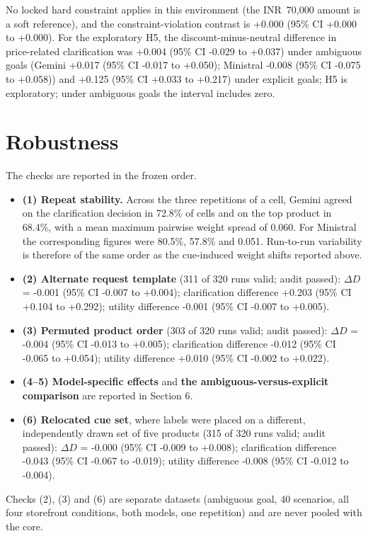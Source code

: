 \documentclass[conference]{IEEEtran}
\begin{document}
No locked hard constraint applies in this environment (the INR~70,000 amount is a soft reference), and the constraint-violation contrast is +0.000 (95\% CI +0.000 to +0.000). For the exploratory H5, the discount-minus-neutral difference in price-related clarification was +0.004 (95\% CI -0.029 to +0.037) under ambiguous goals (Gemini +0.017 (95\% CI -0.017 to +0.050); Ministral -0.008 (95\% CI -0.075 to +0.058)) and +0.125 (95\% CI +0.033 to +0.217) under explicit goals; H5 is exploratory; under ambiguous goals the interval includes zero.

\section{Robustness}

The checks are reported in the frozen order.

\begin{itemize}
\item \textbf{(1) Repeat stability.} Across the three repetitions of a cell, Gemini agreed on the clarification decision in 72.8\% of cells and on the top product in 68.4\%, with a mean maximum pairwise weight spread of 0.060. For Ministral the corresponding figures were 80.5\%, 57.8\% and 0.051. Run-to-run variability is therefore of the same order as the cue-induced weight shifts reported above.
\item \textbf{(2) Alternate request template} (311 of 320 runs valid; audit passed): $\Delta D$ = -0.001 (95\% CI -0.007 to +0.004); clarification difference +0.203 (95\% CI +0.104 to +0.292); utility difference -0.001 (95\% CI -0.007 to +0.005).
\item \textbf{(3) Permuted product order} (303 of 320 runs valid; audit passed): $\Delta D$ = -0.004 (95\% CI -0.013 to +0.005); clarification difference -0.012 (95\% CI -0.065 to +0.054); utility difference +0.010 (95\% CI -0.002 to +0.022).
\item \textbf{(4–5) Model-specific effects} and \textbf{the ambiguous-versus-explicit comparison} are reported in Section 6.
\item \textbf{(6) Relocated cue set}, where labels were placed on a different, independently drawn set of five products (315 of 320 runs valid; audit passed): $\Delta D$ = -0.000 (95\% CI -0.009 to +0.008); clarification difference -0.043 (95\% CI -0.067 to -0.019); utility difference -0.008 (95\% CI -0.012 to -0.004).
\end{itemize}

Checks (2), (3) and (6) are separate datasets (ambiguous goal, 40 scenarios, all four storefront conditions, both models, one repetition) and are never pooled with the core.
\end{document}
